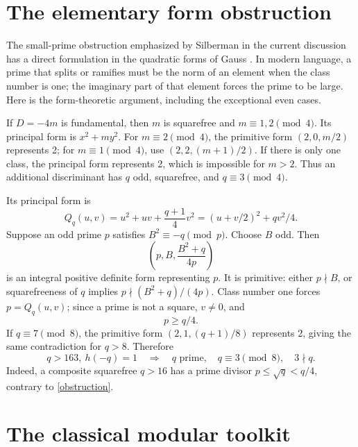 \documentclass[11pt]{article}
\begin{document}
\section{The elementary form obstruction}\label{forms}

The small-prime obstruction emphasized by Silberman in the current
discussion \cite{silberman} has a direct formulation in the quadratic
forms of Gauss \cite{gauss}. In modern language, a prime that splits or
ramifies must be the norm of an element when the class number is one;
the imaginary part of that element forces the prime to be large. Here
is the form-theoretic argument, including the exceptional even cases.

If \(D=-4m\) is fundamental, then \(m\) is squarefree and
\(m\equiv1,2\pmod4\). Its principal form is \(x^2+my^2\).
For \(m\equiv2\pmod4\), the primitive form \((2,0,m/2)\)
represents 2; for \(m\equiv1\pmod4\), use
\((2,2,(m+1)/2)\). If there is only one class, the principal form
represents 2, which is impossible for \(m>2\). Thus an additional
discriminant has \(q\) odd, squarefree, and \(q\equiv3\pmod4\).

Its principal form is
\begin{equation}\label{principal}
 Q_q(u,v)=u^2+uv+\frac{q+1}{4}v^2
         =(u+v/2)^2+qv^2/4.
\end{equation}
Suppose an odd prime \(p\) satisfies \(B^2\equiv-q\pmod p\).
Choose \(B\) odd. Then
\[
 \left(p,B,\frac{B^2+q}{4p}\right)
\]
is an integral positive definite form representing \(p\). It is
primitive: either \(p\nmid B\), or squarefreeness of \(q\)
implies \(p\nmid(B^2+q)/(4p)\). Class number one forces
\(p=Q_q(u,v)\); since a prime is not a square, \(v\ne0\), and
\begin{equation}\label{obstruction}
 p\ge q/4.
\end{equation}
If \(q\equiv7\pmod8\), the primitive form
\((2,1,(q+1)/8)\) represents 2, giving the same contradiction for
\(q>8\). Therefore
\begin{equation}\label{prime-shape}
 q>163,\ h(-q)=1\quad\Longrightarrow\quad
 q\text{ prime},\quad q\equiv3\pmod8,\quad 3\nmid q.
\end{equation}
Indeed, a composite squarefree \(q>16\) has a prime divisor
\(p\le\sqrt q<q/4\), contrary to \eqref{obstruction}.

\section{The classical modular toolkit}\label{toolkit}
\end{document}
